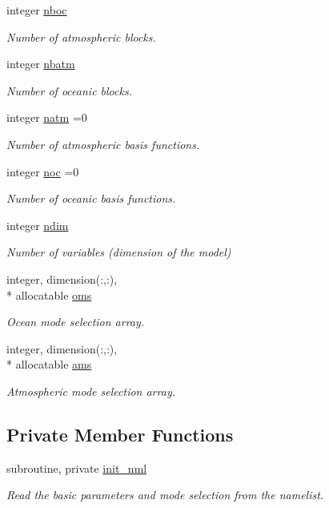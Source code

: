 \begin{DoxyCompactItemize}
integer \hyperlink{classparams_a54123b5a947703d21d0c882dec6780ac}{nboc}
\begin{DoxyCompactList}\small\item\em Number of atmospheric blocks. \end{DoxyCompactList}\item 
integer \hyperlink{classparams_aa5dc201b0a59d8bb25a5dc52d2ed3cac}{nbatm}
\begin{DoxyCompactList}\small\item\em Number of oceanic blocks. \end{DoxyCompactList}\item 
integer \hyperlink{classparams_a4f46551b6a8ad183d2dced1da3dc5fed}{natm} =0
\begin{DoxyCompactList}\small\item\em Number of atmospheric basis functions. \end{DoxyCompactList}\item 
integer \hyperlink{classparams_acdb6ef89bcada9ba7b6b6bba575b60f4}{noc} =0
\begin{DoxyCompactList}\small\item\em Number of oceanic basis functions. \end{DoxyCompactList}\item 
integer \hyperlink{classparams_a2323fe1773f086e20c14f266351c482b}{ndim}
\begin{DoxyCompactList}\small\item\em Number of variables (dimension of the model) \end{DoxyCompactList}\item 
integer, dimension(\-:,\-:), \\*
allocatable \hyperlink{classparams_a5e25e072992d5908eea5308243b7ec63}{oms}
\begin{DoxyCompactList}\small\item\em Ocean mode selection array. \end{DoxyCompactList}\item 
integer, dimension(\-:,\-:), \\*
allocatable \hyperlink{classparams_aa95299f1a9c54693b85e049004369089}{ams}
\begin{DoxyCompactList}\small\item\em Atmospheric mode selection array. \end{DoxyCompactList}\end{DoxyCompactItemize}
\subsection*{Private Member Functions}
\begin{DoxyCompactItemize}
\item 
subroutine, private \hyperlink{classparams_ab21e77dfefda280da4cfdd29117173d5}{init\-\_\-nml}
\begin{DoxyCompactList}\small\item\em Read the basic parameters and mode selection from the namelist. \end{DoxyCompactList}\end{DoxyCompactItemize}


